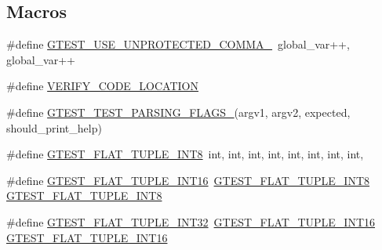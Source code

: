 \subsection*{Macros}
\begin{DoxyCompactItemize}
\item 
\#define \mbox{\hyperlink{_obj__test_2lib_2googletest-master_2googletest_2test_2gtest__unittest_8cc_ad42d1faf4b99498972bc2e03f236521a}{G\+T\+E\+S\+T\+\_\+\+U\+S\+E\+\_\+\+U\+N\+P\+R\+O\+T\+E\+C\+T\+E\+D\+\_\+\+C\+O\+M\+M\+A\+\_\+}}~global\+\_\+var++, global\+\_\+var++
\item 
\#define \mbox{\hyperlink{_obj__test_2lib_2googletest-master_2googletest_2test_2gtest__unittest_8cc_a7720eac5c0fc782a0447f4479923c7bd}{V\+E\+R\+I\+F\+Y\+\_\+\+C\+O\+D\+E\+\_\+\+L\+O\+C\+A\+T\+I\+ON}}
\item 
\#define \mbox{\hyperlink{_obj__test_2lib_2googletest-master_2googletest_2test_2gtest__unittest_8cc_a0c91cd98ee7f96c5c1247f852e46d700}{G\+T\+E\+S\+T\+\_\+\+T\+E\+S\+T\+\_\+\+P\+A\+R\+S\+I\+N\+G\+\_\+\+F\+L\+A\+G\+S\+\_\+}}(argv1,  argv2,  expected,  should\+\_\+print\+\_\+help)
\item 
\#define \mbox{\hyperlink{_obj__test_2lib_2googletest-master_2googletest_2test_2gtest__unittest_8cc_af466a50c3676a701b0b9c5db2263f6e7}{G\+T\+E\+S\+T\+\_\+\+F\+L\+A\+T\+\_\+\+T\+U\+P\+L\+E\+\_\+\+I\+N\+T8}}~int, int, int, int, int, int, int, int,
\item 
\#define \mbox{\hyperlink{_obj__test_2lib_2googletest-master_2googletest_2test_2gtest__unittest_8cc_aae118824bf510fcc9ecc8811db23d2f2}{G\+T\+E\+S\+T\+\_\+\+F\+L\+A\+T\+\_\+\+T\+U\+P\+L\+E\+\_\+\+I\+N\+T16}}~\mbox{\hyperlink{_obj__test_2lib_2googletest-master_2googletest_2test_2gtest__unittest_8cc_af466a50c3676a701b0b9c5db2263f6e7}{G\+T\+E\+S\+T\+\_\+\+F\+L\+A\+T\+\_\+\+T\+U\+P\+L\+E\+\_\+\+I\+N\+T8}} \mbox{\hyperlink{_obj__test_2lib_2googletest-master_2googletest_2test_2gtest__unittest_8cc_af466a50c3676a701b0b9c5db2263f6e7}{G\+T\+E\+S\+T\+\_\+\+F\+L\+A\+T\+\_\+\+T\+U\+P\+L\+E\+\_\+\+I\+N\+T8}}
\item 
\#define \mbox{\hyperlink{_obj__test_2lib_2googletest-master_2googletest_2test_2gtest__unittest_8cc_a1c7baa94acbbb0d0ef250772fdad3972}{G\+T\+E\+S\+T\+\_\+\+F\+L\+A\+T\+\_\+\+T\+U\+P\+L\+E\+\_\+\+I\+N\+T32}}~\mbox{\hyperlink{_obj__test_2lib_2googletest-master_2googletest_2test_2gtest__unittest_8cc_aae118824bf510fcc9ecc8811db23d2f2}{G\+T\+E\+S\+T\+\_\+\+F\+L\+A\+T\+\_\+\+T\+U\+P\+L\+E\+\_\+\+I\+N\+T16}} \mbox{\hyperlink{_obj__test_2lib_2googletest-master_2googletest_2test_2gtest__unittest_8cc_aae118824bf510fcc9ecc8811db23d2f2}{G\+T\+E\+S\+T\+\_\+\+F\+L\+A\+T\+\_\+\+T\+U\+P\+L\+E\+\_\+\+I\+N\+T16}}

\end{DoxyCompactItemize}
